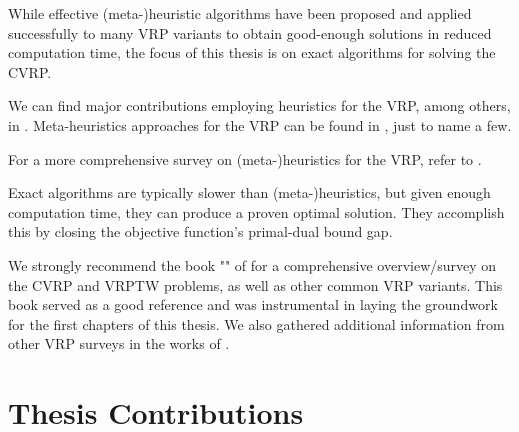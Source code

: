 While effective (meta-)heuristic algorithms have been proposed and applied
successfully to many VRP variants to obtain good-enough solutions
in reduced computation time,
the focus of this thesis is on exact algorithms for solving the CVRP.

We can find major contributions employing heuristics for the VRP, among others, in
\textcite{clarke1964, desrochers1989matching, paessens1988savings, foster1976integer}.
Meta-heuristics approaches for the VRP can be found in
\textcite{gendreau1994tabu, cordeau2012parallel, toth2003granular, li2005very, pisinger2007, kytojoki2007efficient, nagata2009,vidal2012, subramanian2013},
just to name a few.

For a more comprehensive survey on (meta-)heuristics for the VRP, refer to
\textcite{golden1998impact,gendreau2002metaheuristics,gendreau2008,laporte2014chapter,elshaer2020taxonomic}.

Exact algorithms are typically slower than (meta-)heuristics, but given
enough computation time, they can produce a proven optimal solution.
They accomplish this by closing the objective function's primal-dual bound gap.

\medskip

We strongly recommend the book  "" of \textcite{toth2014}
for a comprehensive overview/survey on the CVRP and VRPTW problems,
as well as other common VRP variants.
This book served as a good reference and was instrumental in laying the groundwork
for the first chapters of this thesis.
We also gathered additional information from other VRP surveys in the works of
\textcite{cordeau2007, baldacci2012, caceres-cruz2015, costa2019}.

\section{Thesis Contributions}
\label{sec:intro-thesis-contributions}

